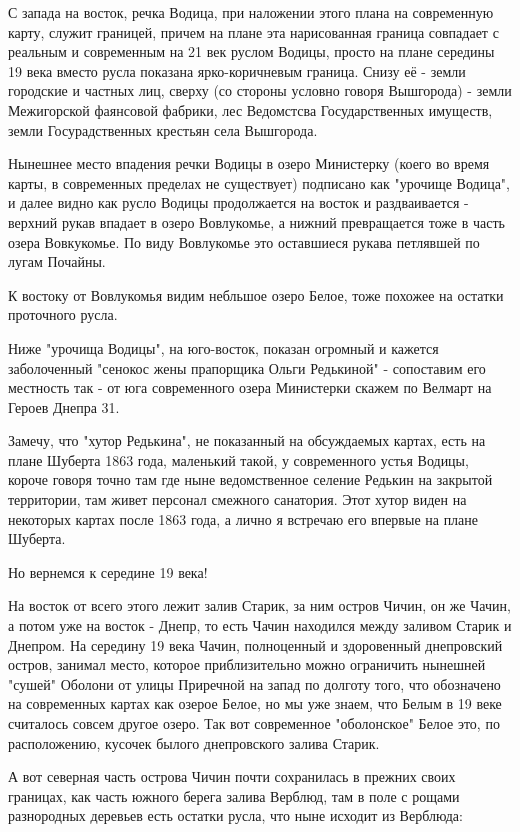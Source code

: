 С запада на восток, речка Водица, при наложении этого плана на современную карту, служит границей, причем на плане эта нарисованная граница совпадает с реальным и современным на 21 век руслом Водицы, просто на плане середины 19 века вместо русла показана ярко-коричневым граница. Снизу её - земли городские и частных лиц, сверху (со стороны условно говоря Вышгорода) - земли Межигорской фаянсовой фабрики, лес Ведомстсва Государственных имуществ, земли Госурадственных крестьян села Вышгорода.

Нынешнее место впадения речки Водицы в озеро Министерку (коего во время карты, в современных пределах не существует) подписано как "урочище Водица", и далее видно как русло Водицы продолжается на восток и раздваивается - верхний рукав впадает в озеро Вовлукомье, а нижний превращается тоже в часть озера Вовкукомье. По виду Вовлукомье это оставшиеся рукава петлявшей по лугам Почайны.

К востоку от Вовлукомья видим небльшое озеро Белое, тоже похожее на остатки проточного русла.

Ниже "урочища Водицы", на юго-восток, показан огромный и кажется заболоченный "сенокос жены прапорщика Ольги Редькиной" - сопоставим его местность так - от юга современного озера Министерки скажем по Велмарт на Героев Днепра 31.

Замечу, что "хутор Редькина", не показанный на обсуждаемых картах, есть на плане Шуберта 1863 года, маленький такой, у современного устья Водицы, короче говоря точно там где ныне ведомственное селение Редькин на закрытой территории, там живет персонал смежного санатория. Этот хутор виден на некоторых картах после 1863 года, а лично я встречаю его впервые на плане Шуберта.

Но вернемся к середине 19 века!

На восток от всего этого лежит залив Старик, за ним остров Чичин, он же Чачин, а потом уже на восток - Днепр, то есть Чачин находился между заливом Старик и Днепром. На середину 19 века Чачин, полноценный и здоровенный днепровский остров, занимал место, которое приблизительно можно ограничить нынешней "сушей" Оболони от улицы Приречной на запад по долготу того, что обозначено на современных картах как озерое Белое, но мы уже знаем, что Белым в 19 веке считалось совсем другое озеро. Так вот современное "оболонское" Белое это, по расположению, кусочек былого днепровского залива Старик.

А вот северная часть острова Чичин почти сохранилась в прежних своих границах, как часть южного берега залива Верблюд, там в поле с рощами разнородных деревьев есть остатки русла, что ныне исходит из Верблюда:

